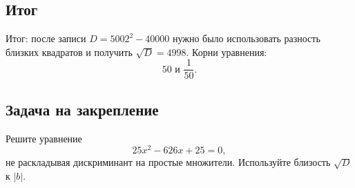 \documentclass[12pt,a4paper]{article}
\begin{document}
\subsection*{Итог}
\textcolor{teal!60!black}{Итог:} после записи $D=5002^2-40000$ нужно было использовать разность близких квадратов и получить $\sqrt D=4998$. Корни уравнения:
\[
\boxed{50\text{ и }\frac1{50}}.
\]

\subsection*{Задача на закрепление}
Решите уравнение
\[
25x^2-626x+25=0,
\]
не раскладывая дискриминант на простые множители. Используйте близость $\sqrt D$ к $|b|$.
\end{document}
